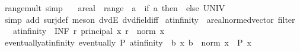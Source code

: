 \begin{isabellebody}
\endisatagproof
{\isafoldproof}%
%
\isadelimproof
\isanewline
%
\endisadelimproof
\isanewline
{}\isamarkupfalse%
\ range{\isacharunderscore}{\kern0pt}mult\ {\isacharbrackleft}{\kern0pt}simp{\isacharbrackright}{\kern0pt}{\isacharcolon}{\kern0pt}\isanewline
\ \ \ a{\isacharcolon}{\kern0pt}{\isacharcolon}{\kern0pt}{\isachardoublequoteopen}real{\isachardoublequoteclose}\ \ {\isachardoublequoteopen}range\ {\isacharparenleft}{\kern0pt}{\isacharparenleft}{\kern0pt}{\isacharasterisk}{\kern0pt}{\isacharparenright}{\kern0pt}\ a{\isacharparenright}{\kern0pt}\ {\isacharequal}{\kern0pt}\ {\isacharparenleft}{\kern0pt}if\ a{\isacharequal}{\kern0pt}{}\ then\ {\isacharbraceleft}{\kern0pt}{}{\isacharbraceright}{\kern0pt}\ else\ UNIV{\isacharparenright}{\kern0pt}{\isachardoublequoteclose}\isanewline
%
\isadelimproof
\ \ %
\endisadelimproof
%
\isatagproof
{}\isamarkupfalse%
\ {\isacharparenleft}{\kern0pt}simp\ add{\isacharcolon}{\kern0pt}\ surj{\isacharunderscore}{\kern0pt}def{\isacharparenright}{\kern0pt}\ {\isacharparenleft}{\kern0pt}meson\ dvdE\ dvd{\isacharunderscore}{\kern0pt}field{\isacharunderscore}{\kern0pt}iff{\isacharparenright}{\kern0pt}%
\endisatagproof
{\isafoldproof}%
%
\isadelimproof
%
\endisadelimproof
%
\isadelimdocument
%
\endisadelimdocument
%
\isatagdocument
%
\isamarkuptrue%
%
\endisatagdocument
{\isafolddocument}%
%
\isadelimdocument
%
\endisadelimdocument
{}\isamarkupfalse%
\ at{\isacharunderscore}{\kern0pt}infinity\ {\isacharcolon}{\kern0pt}{\isacharcolon}{\kern0pt}\ {\isachardoublequoteopen}{\isacharprime}{\kern0pt}a{\isacharcolon}{\kern0pt}{\isacharcolon}{\kern0pt}real{\isacharunderscore}{\kern0pt}normed{\isacharunderscore}{\kern0pt}vector\ filter{\isachardoublequoteclose}\isanewline
\ \ \ {\isachardoublequoteopen}at{\isacharunderscore}{\kern0pt}infinity\ {\isacharequal}{\kern0pt}\ {\isacharparenleft}{\kern0pt}INF\ r{\isachardot}{\kern0pt}\ principal\ {\isacharbraceleft}{\kern0pt}x{\isachardot}{\kern0pt}\ r\ {\isasymle}\ norm\ x{\isacharbraceright}{\kern0pt}{\isacharparenright}{\kern0pt}{\isachardoublequoteclose}\isanewline
\isanewline
{}\isamarkupfalse%
\ eventually{\isacharunderscore}{\kern0pt}at{\isacharunderscore}{\kern0pt}infinity{\isacharcolon}{\kern0pt}\ {\isachardoublequoteopen}eventually\ P\ at{\isacharunderscore}{\kern0pt}infinity\ {\isasymlongleftrightarrow}\ {\isacharparenleft}{\kern0pt}{\isasymexists}b{\isachardot}{\kern0pt}\ {\isasymforall}x{\isachardot}{\kern0pt}\ b\ {\isasymle}\ norm\ x\ {\isasymlongrightarrow}\ P\ x{\isacharparenright}{\kern0pt}{\isachardoublequoteclose}\isanewline

\end{isabellebody}

